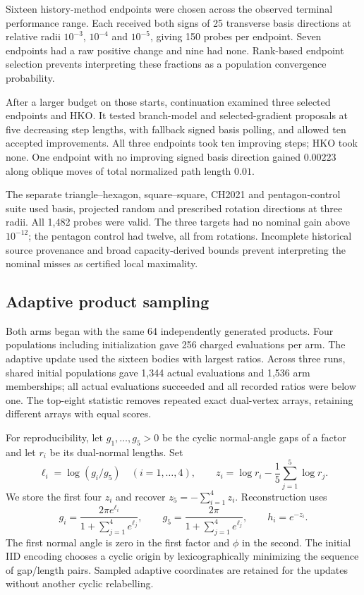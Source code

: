Sixteen history-method endpoints were chosen across the observed terminal
performance range. Each received both signs of 25 transverse basis
directions at relative radii $10^{-3}$, $10^{-4}$ and $10^{-5}$, giving
150 probes per endpoint. Seven endpoints had a raw positive change and
nine had none. Rank-based endpoint selection prevents interpreting these
fractions as a population convergence probability.

After a larger budget on those starts, continuation examined three
selected endpoints and HKO. It tested branch-model and selected-gradient
proposals at five decreasing step lengths, with fallback signed basis
polling, and allowed ten accepted improvements. All three endpoints took
ten improving steps; HKO took none. One endpoint with no improving signed
basis direction gained $0.00223$ along oblique moves of total normalized
path length $0.01$.

The separate triangle--hexagon, square--square, CH2021 and pentagon-control
suite used basis, projected random and prescribed rotation directions at
three radii. All 1,482 probes were valid. The three targets had no nominal
gain above $10^{-12}$; the pentagon control had twelve, all from rotations.
Incomplete historical source provenance and broad capacity-derived bounds
prevent interpreting the nominal misses as certified local maximality.

\FloatBarrier
\subsection{Adaptive product sampling}\label{app:ds-adaptive}

Both arms began with the same 64 independently generated products. Four
populations including initialization gave 256 charged evaluations per arm.
The adaptive update used the sixteen bodies with largest ratios. Across
three runs, shared initial populations gave 1,344 actual evaluations and
1,536 arm memberships; all actual evaluations succeeded and all recorded
ratios were below one. The top-eight statistic removes repeated exact
dual-vertex arrays, retaining different arrays with equal scores.

For reproducibility, let $g_1,\ldots,g_5>0$ be the cyclic normal-angle gaps
of a factor and let $r_i$ be its dual-normal lengths. Set
\[
 \ell_i=\log(g_i/g_5)\quad(i=1,\ldots,4),\qquad
 z_i=\log r_i-\frac15\sum_{j=1}^5\log r_j.
\]
We store the first four $z_i$ and recover $z_5=-\sum_{i=1}^4z_i$.
Reconstruction uses
\[
 g_i=\frac{2\pi e^{\ell_i}}{1+\sum_{j=1}^4e^{\ell_j}},\qquad
 g_5=\frac{2\pi}{1+\sum_{j=1}^4e^{\ell_j}},\qquad h_i=e^{-z_i}.
\]
The first normal angle is zero in the first factor and $\phi$ in the second.
The initial IID encoding chooses a cyclic origin by lexicographically
minimizing the sequence of gap/length pairs. Sampled adaptive coordinates
are retained for the updates without another cyclic relabelling.

